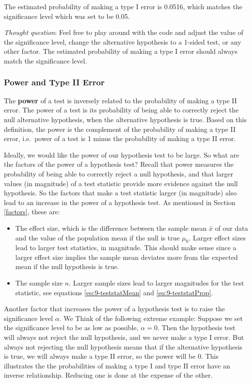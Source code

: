 \documentclass[
]{book}
\begin{document}
The estimated probability of making a type I error is 0.0516, which matches the significance level which was set to be 0.05.

\emph{Thought question}: Feel free to play around with the code and adjust the value of the significance level, change the alternative hypothesis to a 1-sided test, or any other factor. The estimated probability of making a type I error should always match the significance level.

\subsubsection{Power and Type II Error}\label{power}

The \textbf{power} of a test is inversely related to the probability of making a type II error. The power of a test is its probability of being able to correctly reject the null alternative hypothesis, when the alternative hypothesis is true. Based on this definition, the power is the complement of the probability of making a type II error, i.e.~power of a test is 1 minus the probability of making a type II error.

Ideally, we would like the power of our hypothesis test to be large. So what are the factors of the power of a hypothesis test? Recall that power measures the probability of being able to correctly reject a null hypothesis, and that larger values (in magnitude) of a test statistic provide more evidence against the null hypothesis. So the factors that make a test statistic larger (in magnitude) also lead to an increase in the power of a hypothesis test. As mentioned in Section \ref{factors}, these are:

\begin{itemize}
\item
  The effect size, which is the difference between the sample mean \(\bar{x}\) of our data and the value of the population mean if the null is true \(\mu_0\). Larger effect sizes lead to larger test statistics, in magnitude. This should make sense since a larger effect size implies the sample mean deviates more from the expected mean if the null hypothesis is true.
\item
  The sample size \(n\). Larger sample sizes lead to larger magnitudes for the test statistic, see equations \eqref{eq:9-teststatMean} and \eqref{eq:9-teststatProp}.
\end{itemize}

Another factor that increases the power of a hypothesis test is to raise the significance level \(\alpha\). We Think of the following extreme example: Suppose we set the significance level to be as low as possible, \(\alpha=0\). Then the hypothesis test will always not reject the null hypothesis, and we never make a type I error. But always not rejecting the null hypothesis means that if the alternative hypothesis is true, we will always make a type II error, so the power will be 0. This illustrates the the probabilities of making a type I and type II error have an inverse relationship. Reducing one is done at the expense of the other.
\end{document}
